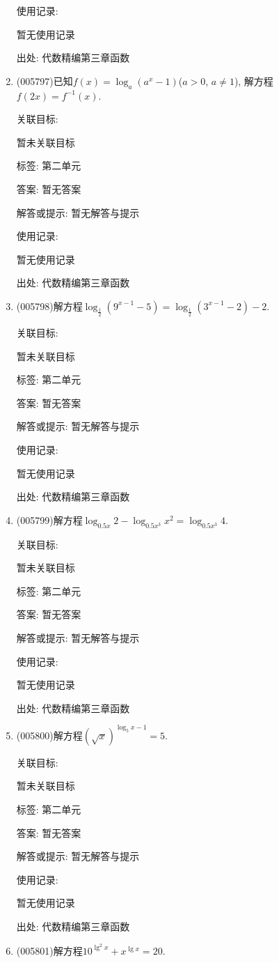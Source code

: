 \documentclass[10pt,a4paper]{article}
\begin{document}
\begin{enumerate}[1.]
使用记录:

暂无使用记录


出处: 代数精编第三章函数
\item { (005797)}已知$f(x)=\log_a(a^x-1)$($a>0$, $a\ne 1$), 解方程$f(2x)=f^{-1}(x)$.


关联目标:

暂未关联目标



标签: 第二单元

答案: 暂无答案

解答或提示: 暂无解答与提示

使用记录:

暂无使用记录


出处: 代数精编第三章函数
\item { (005798)}解方程$\log_{\frac 12}(9^{x-1}-5)=\log_{\frac 12}(3^{x-1}-2)-2$.


关联目标:

暂未关联目标



标签: 第二单元

答案: 暂无答案

解答或提示: 暂无解答与提示

使用记录:

暂无使用记录


出处: 代数精编第三章函数
\item { (005799)}解方程$\log_{0.5x}2-\log_{0.5x^3}x^2=\log_{0.5x^3}4$.


关联目标:

暂未关联目标



标签: 第二单元

答案: 暂无答案

解答或提示: 暂无解答与提示

使用记录:

暂无使用记录


出处: 代数精编第三章函数
\item { (005800)}解方程$(\sqrt x)^{\log_5x-1}=5$.


关联目标:

暂未关联目标



标签: 第二单元

答案: 暂无答案

解答或提示: 暂无解答与提示

使用记录:

暂无使用记录


出处: 代数精编第三章函数
\item { (005801)}解方程$10^{\lg ^2x}+x^{\lg x}=20$.



\end{enumerate}
\end{document}

